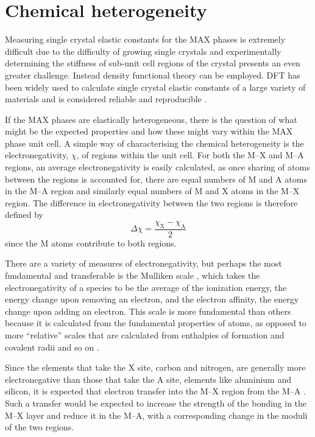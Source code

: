 \section{Chemical heterogeneity}

Measuring single crystal elastic constants for the MAX phases is extremely difficult due to the difficulty of growing single crystals and experimentally determining the stiffness of sub-unit cell regions of the crystal presents an even greater challenge. Instead density functional theory can be employed. DFT has been widely used to calculate single crystal elastic constants of a large variety of materials and is considered reliable and reproducible \cite{Lejaeghere2016}. 



If the MAX phases are elastically heterogeneous, there is the question of what might be the expected properties and how these might vary within the MAX phase unit cell. A simple way of characterising the chemical heterogeneity is the electronegativity, $\chi$, of regions within the unit cell. For both the M--X and M--A regions, an average electronegativity is easily calculated, as once sharing of atoms between the regions is accounted for, there are equal numbers of M and A atoms in the M--A region and similarly equal numbers of M and X atoms in the M--X region. The difference in electronegativity between the two regions is therefore defined by
\begin{equation}
\Delta \chi = \frac{\chi_{\text{X}} - \chi_{\text{A}}}{2}\label{eqn:MAX_electronegativity_diff}
\end{equation}
since the M atoms contribute to both regions. 

There are a variety of measures of electronegativity, but perhaps the most fundamental and transferable is the Mulliken scale \cite{Mulliken1934}, which takes the electronegativity of a species to be the average of the ionization energy, the energy change upon removing an electron, and the electron affinity, the energy change upon adding an electron. This scale is more fundamental than others because it is calculated from the fundamental properties of atoms, as opposed to more ``relative'' scales that are calculated from enthalpies of formation and covalent radii and so on \cite{huheey1983ch3_electronegativity}.

Since the elements that take the X site, carbon and nitrogen, are generally more electronegative than those that take the A site, elements like aluminium and silicon, it is expected that electron transfer into the M--X region from the M--A \cite{Sun2011}. Such a transfer would be expected to increase the strength of the bonding in the M--X layer and reduce it in the M--A, with a corresponding change in the moduli of the two regions.


